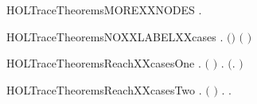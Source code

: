 \newcommand{\HOLTraceTheoremsLRTCXXTRANS}{\UseVerbatim{HOLTraceTheoremsLRTCXXTRANS}}
\begin{SaveVerbatim}{HOLTraceTheoremsMOREXXNODES}
\HOLTokenTurnstile{} \HOLSymConst{\HOLTokenForall{}}  .  \HOLConst{\HOLTokenIn{}}   \HOLSymConst{\HOLTokenConj{}}    \HOLSymConst{\HOLTokenImp{}}  \HOLConst{\HOLTokenIn{}}  
\end{SaveVerbatim}
\newcommand{\HOLTraceTheoremsMOREXXNODES}{\UseVerbatim{HOLTraceTheoremsMOREXXNODES}}
\begin{SaveVerbatim}{HOLTraceTheoremsNOXXLABELXXcases}
\HOLTokenTurnstile{} \HOLSymConst{\HOLTokenForall{}} .  \ensuremath{(}\HOLSymConst{::}\ensuremath{)} \HOLSymConst{\HOLTokenEquiv{}} \ensuremath{(} \HOLSymConst{\ensuremath{=}} \HOLConst{\ensuremath{\tau}}\ensuremath{)} \HOLSymConst{\HOLTokenConj{}}  
\end{SaveVerbatim}
\newcommand{\HOLTraceTheoremsNOXXLABELXXcases}{\UseVerbatim{HOLTraceTheoremsNOXXLABELXXcases}}
\begin{SaveVerbatim}{HOLTraceTheoremsReachXXcasesOne}
\HOLTokenTurnstile{} \HOLSymConst{\HOLTokenForall{}} .    \HOLSymConst{\HOLTokenEquiv{}} \ensuremath{(} \HOLSymConst{\ensuremath{=}} \ensuremath{)} \HOLSymConst{\HOLTokenDisj{}} \HOLSymConst{\HOLTokenExists{}}. \ensuremath{(}\HOLSymConst{\HOLTokenExists{}}.  \HOLTokenTransBegin{}\HOLTokenTransEnd {}\ensuremath{)} \HOLSymConst{\HOLTokenConj{}}   
\end{SaveVerbatim}
\newcommand{\HOLTraceTheoremsReachXXcasesOne}{\UseVerbatim{HOLTraceTheoremsReachXXcasesOne}}
\begin{SaveVerbatim}{HOLTraceTheoremsReachXXcasesTwo}
\HOLTokenTurnstile{} \HOLSymConst{\HOLTokenForall{}} .    \HOLSymConst{\HOLTokenEquiv{}} \ensuremath{(} \HOLSymConst{\ensuremath{=}} \ensuremath{)} \HOLSymConst{\HOLTokenDisj{}} \HOLSymConst{\HOLTokenExists{}}.    \HOLSymConst{\HOLTokenConj{}} \HOLSymConst{\HOLTokenExists{}}.  \HOLTokenTransBegin{}\HOLTokenTransEnd {}
\end{SaveVerbatim}
